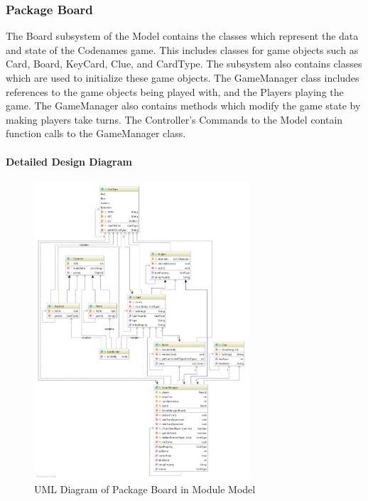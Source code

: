 \subsubsection{Package Board}
The Board subsystem of the Model contains the classes which represent the data and state of the Codenames game. This includes classes for game objects such as Card, Board, KeyCard, Clue, and CardType. The subsystem also contains classes which are used to initialize these game objects. The GameManager class includes references to the game objects being played with, and the Players playing the game. The GameManager also contains methods which modify the game state by making players take turns. The Controller's Commands to the Model contain function calls to the GameManager class.

\paragraph{Detailed Design Diagram}\mbox{}
\begin{figure}[H]
\centering
\includegraphics[width=8cm]{Source/Module/Model/Board/Model_Board.png}
\caption{UML Diagram of Package Board in Module Model}
\end{figure}













